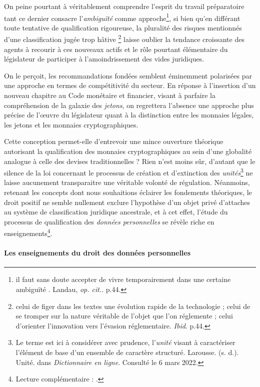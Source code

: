 {On peine pourtant à véritablement comprendre l'esprit du travail préparatoire tant ce dernier consacre l'\emph{ambiguïté} comme approche\footnote{\og [...] il faut sans doute accepter de vivre temporairement dans une certaine ambiguïté \fg{}. Landau, \emph{op. cit.}. p.44.}, si bien qu'en différant toute tentative de qualification rigoureuse, la pluralité des risques mentionnés d'une classification jugée \og trop hâtive \fg{}\footnote{\og [...] celui de figer dans les textes une évolution rapide de la technologie ; celui de se tromper sur la nature véritable de l'objet que l'on réglemente ; celui d'orienter l'innovation vers l'évasion réglementaire\fg{}. \emph{Ibid}. p.44.} laisse oublier la tendance croissante des agents à recourir à ces nouveaux actifs et le rôle pourtant élémentaire du législateur de participer à l'amoindrissement des vides juridiques.\par

On le perçoit, les recommandations fondées semblent éminemment polarisées par une approche en termes de compétitivité du secteur. En réponse à l'insertion d'un nouveau chapitre au Code monétaire et financier, visant à parfaire la compréhension de la galaxie des \emph{jetons}, on regrettera l'absence une approche plus précise de l'\oe{}uvre du législateur quant à la distinction entre les monnaies légales, les jetons et les monnaies cryptographiques.\par
Cette conception permet-elle d'entrevoir une mince ouverture théorique autorisant la qualification des monnaies cryptographiques au sein d'une globalité analogue à celle des devises traditionnelles ? Rien n'est moins sûr, d'autant que le silence de la loi concernant le processus de création et d'extinction des \emph{unités}\footnote{Le terme est ici à considérer avec prudence, l'\emph{unité} visant à caractériser l'élément de base d'un ensemble de caractère structuré. Larousse. (s. d.). Unité. dans ​\emph{Dictionnaire en ligne}.​ Consulté le 6 mars 2022.} ne laisse aucunement transparaitre une véritable volonté de régulation. Néanmoins, retenant les concepts dont nous souhaitions éclairer les fondements théoriques, le droit positif ne semble nullement exclure l'hypothèse d'un objet privé d'attaches au système de classification juridique ancestrale, et à cet effet, l'étude du processus de qualification des \emph{données personnelles} se révèle riche en enseignements\footnote{Lecture complémentaire : .}. 

\paragraph{Les enseignements du droit des données personnelles}

}
